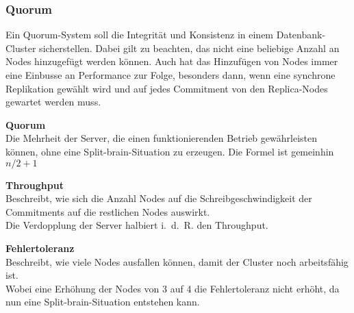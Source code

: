 
\clearpage
\subsubsection{Quorum}
\label{subsubsec:quorum}
\begin{flushleft}
    Ein Quorum-System soll die Integrität und Konsistenz in einem Datenbank-Cluster sicherstellen.
    Dabei gilt zu beachten, das nicht eine beliebige Anzahl an Nodes hinzugefügt werden können.
    Auch hat das Hinzufügen von Nodes immer eine Einbusse an Performance zur Folge, besonders dann, wenn eine synchrone Replikation gewählt wird und auf jedes Commitment von den Replica-Nodes gewartet werden muss.

    \begin{description}
        \item \textbf{Quorum}\hfill \\Die Mehrheit der Server, die einen funktionierenden Betrieb gewährleisten können, ohne eine \Gls{Split-brain}-Situation zu erzeugen.
        Die Formel ist gemeinhin \(n/2 + 1\)
        \item \textbf{Throughput}\hfill \\Beschreibt, wie sich die Anzahl Nodes auf die Schreibgeschwindigkeit der Commitments auf die restlichen Nodes auswirkt.\\Die Verdopplung der Server halbiert i. d. R. den Throughput.
        \item \textbf{Fehlertoleranz}\hfill \\Beschreibt, wie viele Nodes ausfallen können, damit der Cluster noch arbeitsfähig ist.\\Wobei eine Erhöhung der Nodes von 3 auf 4 die Fehlertoleranz nicht erhöht, da nun eine \Gls{Split-brain}-Situation entstehen kann.
    \end{description}

\end{flushleft}
